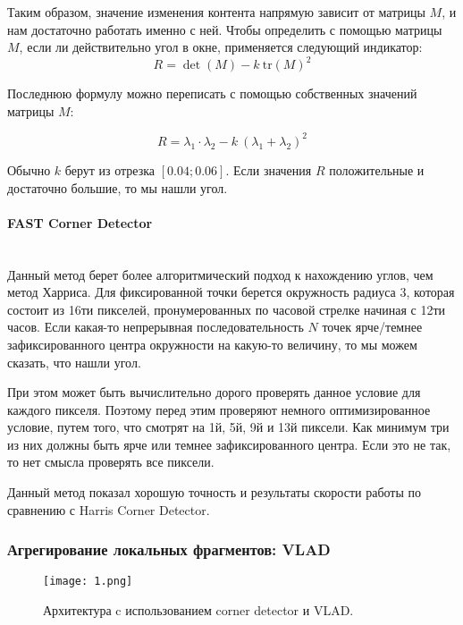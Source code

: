     \bigskip
    \noindent

    Таким образом, значение изменения контента напрямую зависит от матрицы $M$, и нам достаточно работать именно с ней. Чтобы определить с помощью матрицы $M$, если ли действительно угол в окне, применяется следующий индикатор:
    $$
        R = \det(M) - k \: \text{tr}(M)^2
    $$
    \noindent

    Последнюю формулу можно переписать с помощью собственных значений матрицы $M$:

    $$
        R = \lambda_1 \cdot \lambda_2 - k \: (\lambda_1 + \lambda_2)^2
    $$
    \noindent

    Обычно $k$ берут из отрезка $[0.04; 0.06]$. Если значения $R$ положительные и достаточно большие, то мы нашли угол. 

    \paragraph{FAST Corner Detector}\mbox{} \\
    Данный метод берет более алгоритмический подход к нахождению углов, чем метод Харриса. Для фиксированной точки берется окружность радиуса 3, которая состоит из 16ти пикселей, пронумерованных по часовой стрелке начиная с 12ти часов. Если какая-то непрерывная последовательность $N$ точек ярче/темнее зафиксированного центра окружности на какую-то величину, то мы можем сказать, что нашли угол. 

    При этом может быть вычислительно дорого проверять данное условие для каждого пикселя. Поэтому перед этим проверяют немного оптимизированное условие, путем того, что смотрят на 1й, 5й, 9й и 13й пиксели. Как минимум три из них должны быть ярче или темнее зафиксированного центра. Если это не так, то нет смысла проверять все пиксели.

    Данный метод показал хорошую точность и результаты скорости работы по сравнению с Harris Corner Detector.

\subsubsection{Агрегирование локальных фрагментов: VLAD}

    \begin{figure}[htbp]
        \centering
        \texttt{[image: 1.png]}
        \caption{Архитектура c использованием corner detector и VLAD.}
        \label{fig:example}
    \end{figure}

